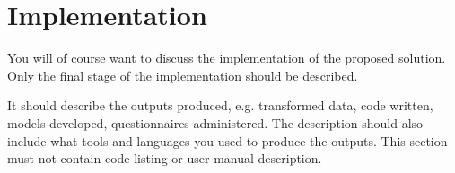 
\section{Implementation}
\label{sec:Implementation}

You will of course want to discuss the implementation of the proposed solution. Only the final stage of the implementation should be described.

It should describe the outputs produced, e.g. transformed data, code written, models developed, questionnaires administered. The description should also include what tools and languages you used to produce the outputs. This section must not contain code listing or user manual description.
